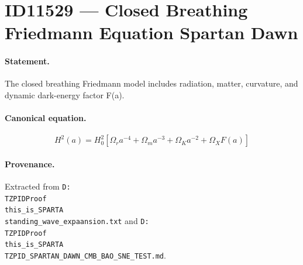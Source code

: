 \section*{ID11529 --- Closed Breathing Friedmann Equation Spartan Dawn}

\paragraph{Statement.}
The closed breathing Friedmann model includes radiation, matter, curvature, and dynamic dark-energy factor F(a).

\paragraph{Canonical equation.}
\[
H^2(a)=H_0^2[\Omega_r a^{-4}+\Omega_m a^{-3}+\Omega_K a^{-2}+\Omega_XF(a)]
\]

\paragraph{Provenance.}
Extracted from \texttt{D:\\TZPIDProof\\this\_is\_SPARTA\\standing\_wave\_expaansion.txt} and \texttt{D:\\TZPIDProof\\this\_is\_SPARTA\\TZPID\_SPARTAN\_DAWN\_CMB\_BAO\_SNE\_TEST.md}.
